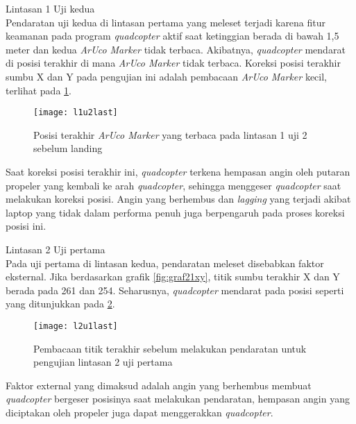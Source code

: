\begin{packed_enum}
	\item Lintasan 1 Uji kedua
	\\ Pendaratan uji kedua di lintasan pertama yang meleset terjadi karena fitur keamanan pada program \textit{quadcopter} aktif saat ketinggian berada di bawah 1,5 meter dan kedua \textit{ArUco Marker} tidak terbaca. Akibatnya, \textit{quadcopter} mendarat di posisi terakhir di mana \textit{ArUco Marker} tidak terbaca.
	Koreksi posisi terakhir sumbu X dan Y pada pengujian ini adalah pembacaan \textit{ArUco Marker} kecil, terlihat pada \cref{fig:l1u2last}. 
	
	\begin{figure}[H]
		\centering
		\texttt{[image: l1u2last]}
		\caption{Posisi terakhir \textit{ArUco Marker} yang terbaca pada lintasan 1 uji 2 sebelum landing}
		\label{fig:l1u2last}
	\end{figure}
	
	Saat koreksi posisi terakhir ini, \textit{quadcopter} terkena hempasan angin oleh putaran propeler yang kembali ke arah \textit{quadcopter}, sehingga menggeser \textit{quadcopter} saat melakukan koreksi posisi. Angin yang berhembus dan \textit{lagging} yang terjadi akibat laptop yang tidak dalam performa penuh juga berpengaruh pada proses koreksi posisi ini.
	
	
	\item Lintasan 2 Uji pertama
	\\ Pada uji pertama di lintasan kedua, pendaratan meleset disebabkan faktor eksternal. Jika berdasarkan grafik \cref{fig:graf21xy}, titik sumbu terakhir X dan Y berada pada 261 dan 254. Seharusnya, \textit{quadcopter} mendarat pada posisi seperti yang ditunjukkan pada \cref{fig:l2u1last}.
	
	\begin{figure}[H]
		\centering
		\texttt{[image: l2u1last]}
		\caption{Pembacaan titik terakhir sebelum melakukan pendaratan untuk pengujian lintasan 2 uji pertama}
		\label{fig:l2u1last}
	\end{figure}
	
	Faktor external yang dimaksud adalah angin yang berhembus membuat \textit{quadcopter} bergeser posisinya saat melakukan pendaratan, hempasan angin yang diciptakan oleh propeler juga dapat menggerakkan \textit{quadcopter}.
	
\end{packed_enum}

